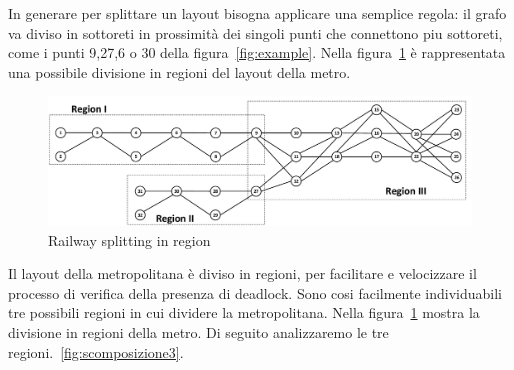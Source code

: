 \documentclass{ewic}
\begin{document}
In generare per splittare un layout bisogna applicare una semplice regola: il grafo va diviso
in sottoreti in prossimità dei singoli punti che connettono piu sottoreti, come i punti 9,27,6 o 30 della figura~\ref{fig:example}. Nella figura~\ref{fig:split} è rappresentata una possibile divisione in regioni del layout della metro.

\begin{figure}[htp]
			\begin{centering}	
				\includegraphics[scale=0.25]{img/region}
				\caption{Railway splitting in region}
				\label{fig:split}
				\end{centering}
			\end{figure}	
	
			Il layout della metropolitana è diviso in regioni, per facilitare e velocizzare il processo di verifica della presenza di deadlock. Sono cosi facilmente individuabili tre possibili regioni in cui dividere la metropolitana. Nella figura~\ref{fig:split} mostra la divisione in regioni della metro.
			Di seguito analizzaremo le tre regioni.~\ref{fig:scomposizione3}.
			
			
				
			
			
			
			
%			
			
\end{document}
